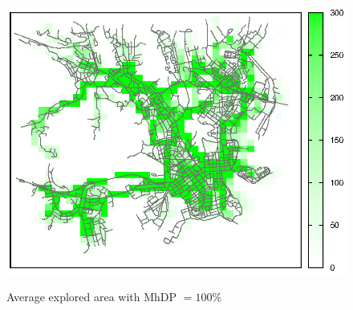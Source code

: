 \begin{figure}[htbp]
{\includegraphics[scale=0.85]{grafici/mappe/M2MShare_3_hop_100perc.eps}}
\caption{Average explored area with MhDP $= 100\%$\label{fig:mappaMultiHop_10}}
\end{figure}





%
%

